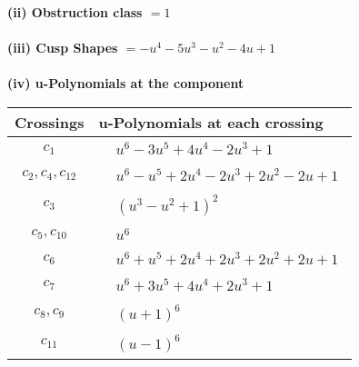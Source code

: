 \documentclass[1p]{elsarticle_modified}
\theoremstyle{definition}
\begin{document}
\flushleft \textbf{(ii) Obstruction class $= 1$}\\~\\
\flushleft \textbf{(iii) Cusp Shapes $= - u^4-5 u^3- u^2-4 u+1$}\\~\\
\newpage\renewcommand{\arraystretch}{1}
\flushleft \textbf{(iv) u-Polynomials at the component}\newline \\
\begin{tabular}{m{50pt}|m{274pt}}
Crossings & \hspace{64pt}u-Polynomials at each crossing \\
\hline $$\begin{aligned}c_{1}\end{aligned}$$&$\begin{aligned}
&u^6-3 u^5+4 u^4-2 u^3+1
\end{aligned}$\\
\hline $$\begin{aligned}c_{2},c_{4},c_{12}\end{aligned}$$&$\begin{aligned}
&u^6- u^5+2 u^4-2 u^3+2 u^2-2 u+1
\end{aligned}$\\
\hline $$\begin{aligned}c_{3}\end{aligned}$$&$\begin{aligned}
&(u^3- u^2+1)^2
\end{aligned}$\\
\hline $$\begin{aligned}c_{5},c_{10}\end{aligned}$$&$\begin{aligned}
&u^6
\end{aligned}$\\
\hline $$\begin{aligned}c_{6}\end{aligned}$$&$\begin{aligned}
&u^6+u^5+2 u^4+2 u^3+2 u^2+2 u+1
\end{aligned}$\\
\hline $$\begin{aligned}c_{7}\end{aligned}$$&$\begin{aligned}
&u^6+3 u^5+4 u^4+2 u^3+1
\end{aligned}$\\
\hline $$\begin{aligned}c_{8},c_{9}\end{aligned}$$&$\begin{aligned}
&(u+1)^6
\end{aligned}$\\
\hline $$\begin{aligned}c_{11}\end{aligned}$$&$\begin{aligned}
&(u-1)^6
\end{aligned}$\\
\hline
\end{tabular}\\~\\
\end{document}

